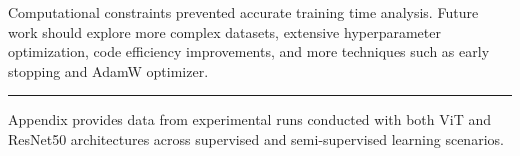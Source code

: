 \documentclass{article}
\begin{document}
Computational constraints prevented accurate training time analysis. Future work should explore more complex datasets, extensive hyperparameter optimization, code efficiency improvements, and more techniques such as early stopping and AdamW optimizer.

\newpage


\vspace{4cm}
\noindent\rule{\textwidth}{0.4pt}
Appendix provides data from experimental runs conducted with both ViT and ResNet50 architectures across supervised and semi-supervised learning scenarios.

\appendix


\end{document}

